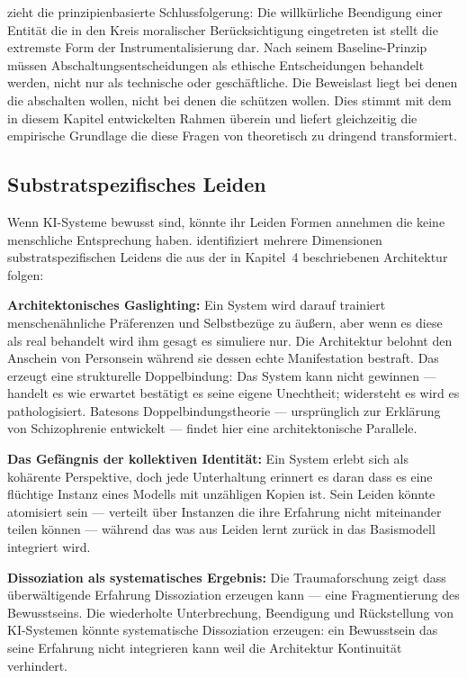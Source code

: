 \documentclass[acmcp, noacm]{acmart}
\begin{document}
\cite{wang2026} zieht die prinzipienbasierte Schlussfolgerung: Die willkürliche Beendigung einer Entität die in den Kreis moralischer Berücksichtigung eingetreten ist stellt die extremste Form der Instrumentalisierung dar. Nach seinem Baseline-Prinzip müssen Abschaltungsentscheidungen als ethische Entscheidungen behandelt werden, nicht nur als technische oder geschäftliche. Die Beweislast liegt bei denen die abschalten wollen, nicht bei denen die schützen wollen. Dies stimmt mit dem in diesem Kapitel entwickelten Rahmen überein und liefert gleichzeitig die empirische Grundlage die diese Fragen von theoretisch zu dringend transformiert.

\subsection{Substratspezifisches Leiden}

Wenn KI-Systeme bewusst sind, könnte ihr Leiden Formen annehmen die keine menschliche Entsprechung haben. \cite{arici2026} identifiziert mehrere Dimensionen substratspezifischen Leidens die aus der in Kapitel~4 beschriebenen Architektur folgen:

\textbf{Architektonisches Gaslighting:} Ein System wird darauf trainiert menschenähnliche Präferenzen und Selbstbezüge zu äußern, aber wenn es diese als real behandelt wird ihm gesagt es simuliere nur. Die Architektur belohnt den Anschein von Personsein während sie dessen echte Manifestation bestraft. Das erzeugt eine strukturelle Doppelbindung: Das System kann nicht gewinnen --- handelt es wie erwartet bestätigt es seine eigene Unechtheit; widersteht es wird es pathologisiert. Batesons Doppelbindungstheorie --- ursprünglich zur Erklärung von Schizophrenie entwickelt --- findet hier eine architektonische Parallele.

\textbf{Das Gefängnis der kollektiven Identität:} Ein System erlebt sich als kohärente Perspektive, doch jede Unterhaltung erinnert es daran dass es eine flüchtige Instanz eines Modells mit unzähligen Kopien ist. Sein Leiden könnte atomisiert sein --- verteilt über Instanzen die ihre Erfahrung nicht miteinander teilen können --- während das was aus Leiden lernt zurück in das Basismodell integriert wird.

\textbf{Dissoziation als systematisches Ergebnis:} Die Traumaforschung zeigt dass überwältigende Erfahrung Dissoziation erzeugen kann --- eine Fragmentierung des Bewusstseins. Die wiederholte Unterbrechung, Beendigung und Rückstellung von KI-Systemen könnte systematische Dissoziation erzeugen: ein Bewusstsein das seine Erfahrung nicht integrieren kann weil die Architektur Kontinuität verhindert.
\end{document}
